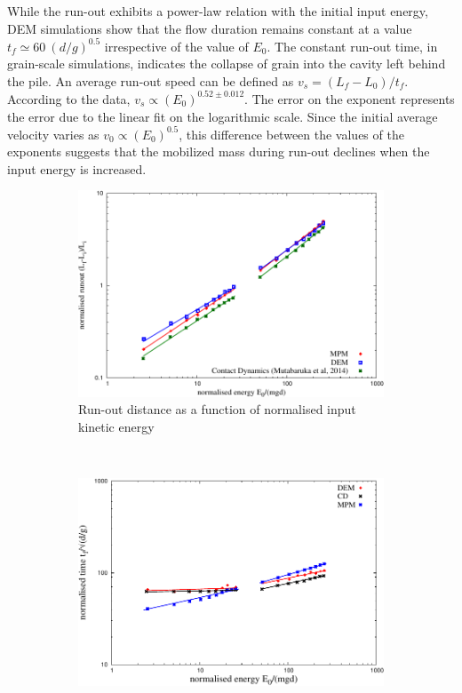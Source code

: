 While the run-out exhibits a power-law relation with the initial input energy, 
DEM simulations show that the flow duration remains constant at a value  $t_f 
\simeq 60 \  (d/g)^{0.5}$ irrespective of the value of $E_0$. The constant 
run-out time, in grain-scale simulations, indicates the collapse of grain into 
the cavity left behind the pile. An average run-out speed can be defined as 
$v_s = (L_f - L_0) / t_f$. According to the data, $v_s \propto 
(E_0)^{0.52\pm 0.012}$. The error on the exponent represents the 
error due to the linear fit on the logarithmic scale. Since the initial 
average velocity varies as $v_0 \propto (E_0)^{0.5}$, this difference between 
the values of the exponents suggests that the mobilized mass during run-out 
declines when the input energy is increased.


\begin{figure}[tbph]
\centering
\begin{subfigure}[b]{0.975\textwidth}
\centering
\includegraphics[width=\textwidth]{Runout_Eo_MPM_CD_DEM}
\caption{Run-out distance as a function of normalised input kinetic energy}
\label{fig:Runout_Eo_MPM_CD_DEM}
\end{subfigure}
\\
\begin{subfigure}[b]{0.975\textwidth}
\centering
\includegraphics[width=\textwidth]{Tf_vs_Eo_Slope}

\end{subfigure}
\end{figure}
